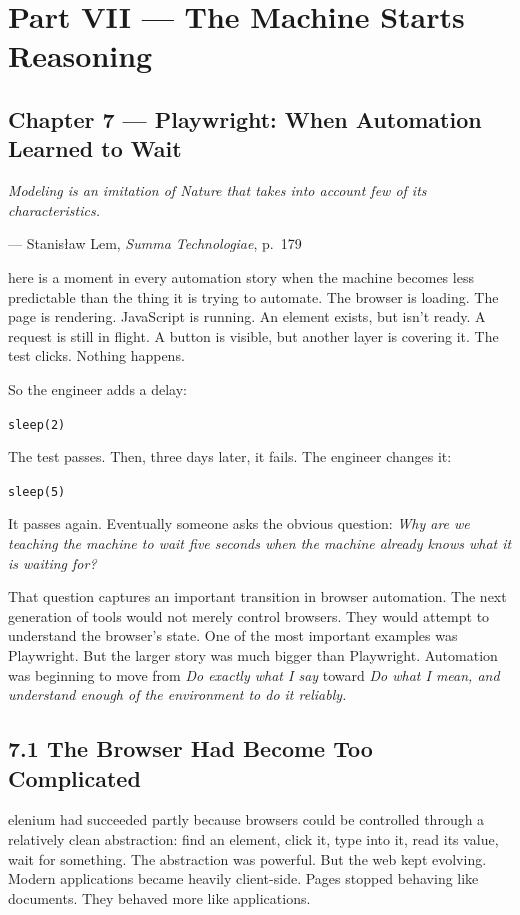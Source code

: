 \documentclass[11pt, a4paper, openany]{book}
\newcommand{\initialcap}[1]{{\fontfamily{lmss}\selectfont\huge\textbf{#1}}}
\providecommand{\epigraphlem}[2]{%
  \begin{flushright}\begin{minipage}{0.72\textwidth}\raggedleft
  \itshape #1\par\vspace{0.4em}\normalfont\small --- #2
  \end{minipage}\end{flushright}\vspace{1.2em}}
\begin{document}
\mainmatter

\chapter*{Part VII --- The Machine Starts Reasoning}

\section*{Chapter 7 --- Playwright: When Automation Learned to Wait}

\epigraphlem{Modeling is an imitation of Nature that takes into account few of its characteristics.}{Stanisław Lem, \textit{Summa Technologiae}, p.~179}


\noindent \initialcap{T}here is a moment in every automation story when the machine becomes less predictable than the thing it is trying to automate. The browser is loading. The page is rendering. JavaScript is running. An element exists, but isn't ready. A request is still in flight. A button is visible, but another layer is covering it. The test clicks. Nothing happens. 

So the engineer adds a delay:
\begin{center}
\texttt{sleep(2)}
\end{center}
The test passes. Then, three days later, it fails. The engineer changes it:
\begin{center}
\texttt{sleep(5)}
\end{center}
It passes again. Eventually someone asks the obvious question: \textit{Why are we teaching the machine to wait five seconds when the machine already knows what it is waiting for?}

That question captures an important transition in browser automation. The next generation of tools would not merely control browsers. They would attempt to understand the browser's state. One of the most important examples was Playwright. But the larger story was much bigger than Playwright. Automation was beginning to move from \textit{Do exactly what I say} toward \textit{Do what I mean, and understand enough of the environment to do it reliably.}

\section{7.1 The Browser Had Become Too Complicated}
\noindent \initialcap{S}elenium had succeeded partly because browsers could be controlled through a relatively clean abstraction: find an element, click it, type into it, read its value, wait for something. The abstraction was powerful. But the web kept evolving. Modern applications became heavily client-side. Pages stopped behaving like documents. They behaved more like applications. 
\end{document}
